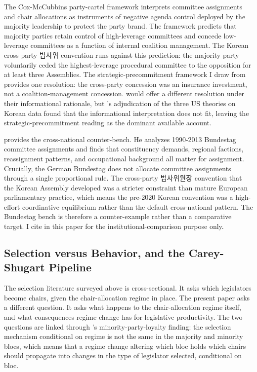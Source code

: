 \documentclass[11pt]{article}
\begin{document}
The Cox-McCubbins party-cartel framework \citep[ch.~3]{coxmccubbins2005} interprets committee assignments and chair allocations as instruments of negative agenda control deployed by the majority leadership to protect the party brand. The framework predicts that majority parties retain control of high-leverage committees and concede low-leverage committees as a function of internal coalition management. The Korean cross-party 법사위 convention runs against this prediction: the majority party voluntarily ceded the highest-leverage procedural committee to the opposition for at least three Assemblies. The strategic-precommitment framework I draw from \citet{jeong2023} provides one resolution: the cross-party concession was an insurance investment, not a coalition-management concession. \citet{gilligankrehbiel1987} would offer a different resolution under their informational rationale, but \citet{choikoo2018}'s adjudication of the three US theories on Korean data found that the informational interpretation does not fit, leaving the strategic-precommitment reading as the dominant available account.

\citet{mickler2017} provides the cross-national counter-bench. He analyzes 1990-2013 Bundestag committee assignments and finds that constituency demands, regional factions, reassignment patterns, and occupational background all matter for assignment. Crucially, the German Bundestag does not allocate committee assignments through a single proportional rule. The cross-party 법사위원장 convention that the Korean Assembly developed was a stricter constraint than mature European parliamentary practice, which means the pre-2020 Korean convention was a high-effort coordinative equilibrium rather than the default cross-national pattern. The Bundestag bench is therefore a counter-example rather than a comparative target. I cite \citet{mickler2017} in this paper for the institutional-comparison purpose only.

\subsection{Selection versus Behavior, and the Carey-Shugart Pipeline}

The selection literature surveyed above is cross-sectional. It asks which legislators become chairs, given the chair-allocation regime in place. The present paper asks a different question. It asks what happens to the chair-allocation regime itself, and what consequences regime change has for legislative productivity. The two questions are linked through \citet{kang2023}'s minority-party-loyalty finding: the selection mechanism conditional on regime is not the same in the majority and minority blocs, which means that a regime change altering which bloc holds which chairs should propagate into changes in the type of legislator selected, conditional on bloc.
\end{document}
